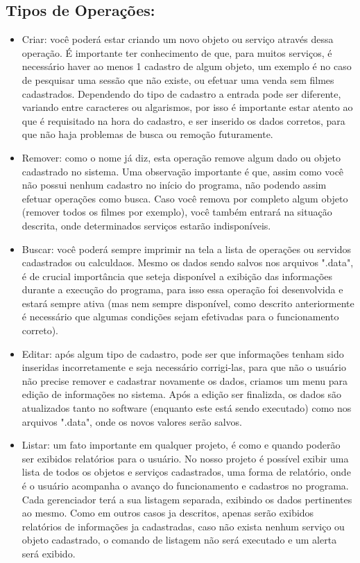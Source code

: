 \documentclass[a4paper]{article}
\begin{document}
\subsection{Tipos de Operações:}
\begin{itemize}
\item{Criar: você poderá estar criando um novo objeto ou serviço através dessa operação. É importante ter conhecimento de que, para muitos serviços, é necessário haver ao menos 1 cadastro de algum objeto, um exemplo é no caso de pesquisar uma sessão que não existe, ou efetuar uma venda sem filmes cadastrados. Dependendo do tipo de cadastro a entrada pode ser diferente, variando entre caracteres ou algarismos, por isso é importante estar atento ao que é requisitado na hora do cadastro, e ser inserido os dados corretos, para que não haja problemas de busca ou remoção futuramente.}
\item{Remover: como o nome já diz, esta operação remove algum dado ou objeto cadastrado no sistema. Uma observação importante é que, assim como você não possui nenhum cadastro no início do programa, não podendo assim efetuar operações como busca. Caso você remova por completo algum objeto (remover todos os filmes por exemplo), você também entrará na situação descrita, onde determinados serviços estarão indisponíveis.}
\item{Buscar: você poderá sempre imprimir na tela a lista de operações ou servidos cadastrados ou calculdaos. Mesmo os dados sendo salvos nos arquivos ".data", é de crucial importância que seteja disponível a exibição das informações durante a execução do programa, para isso essa operação foi desenvolvida e estará sempre ativa (mas nem sempre disponível, como descrito anteriormente é necessário que algumas condições sejam efetivadas para o funcionamento correto).}
\item{Editar: após algum tipo de cadastro, pode ser que informações tenham sido inseridas incorretamente e seja necessário corrigi-las, para que não o usuário não precise remover e cadastrar novamente os dados, criamos um menu para edição de informações no sistema. Após a edição ser finalizda, os dados são atualizados tanto no software (enquanto este está sendo executado) como nos arquivos ".data", onde os novos valores serão salvos.}
\item{Listar: um fato importante em qualquer projeto, é como e quando poderão ser exibidos relatórios para o usuário. No nosso projeto é possível exibir uma lista de todos os objetos e serviços cadastrados, uma forma de relatório, onde é o usuário acompanha o avanço do funcionamento e cadastros no programa. Cada gerenciador terá a sua listagem separada, exibindo os dados pertinentes ao mesmo. Como em outros casos ja descritos, apenas serão exibidos relatórios de informações ja cadastradas, caso não exista nenhum serviço ou objeto cadastrado, o comando de listagem não será executado e um alerta será exibido.}
\end{itemize}
\end{document}
